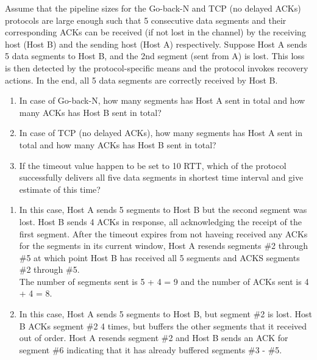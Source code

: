 \documentclass{report}
\begin{document}
\clearpage
\begin{problem}

Assume that the pipeline sizes for the Go-back-N and TCP (no delayed ACKs)
protocols are large enough such that 5 consecutive data segments and their
corresponding ACKs can be received (if not lost in the channel) by the
receiving host (Host B) and the sending host (Host A) respectively.  Suppose
Host A sends 5 data segments to Host B, and the 2nd segment (sent from A) is
lost.  This loss is then detected by the protocol-specific means and the
protocol invokes recovery actions.  In the end, all 5 data segments are
correctly received by Host B.

\begin{enumerate}
\item In case of Go-back-N, how many segments has Host A sent in total and how
      many ACKs has Host B sent in total? 

\item In case of TCP (no delayed ACKs), how many segments has Host A sent in
      total and how many ACKs has Host B sent in total? 

\item If the timeout value happen to be set to 10 RTT, which of the protocol
      successfully delivers all five data segments in shortest time interval
      and give estimate of this time?
\end{enumerate}

\begin{answer}{30em}
  \begin{enumerate}
    \item In this case, Host A sends 5 segments to Host B but the second
          segment was lost. Host B sends 4 ACKs in response, all acknowledging
          the receipt of the first segment. After the timeout expires from not
          haveing received any ACKs for the segments in its current window,
          Host A resends segments \#2 through \#5 at which point Host B has
          received all 5 segments and ACKS segments \#2 through \#5. \\

          The number of segments sent is 5 + 4 = 9 and the number of ACKs sent
          is 4 + 4 = 8.

    \item In this case, Host A sends 5 segments to Host B, but segment \#2 is
          lost. Host B ACKs segment \#2 4 times, but buffers the other segments
          that it received out of order. Host A resends segment \#2 and Host B
          sends an ACK for segment \#6 indicating that it has already buffered
          segments \#3 - \#5.


\end{enumerate}
\end{answer}
\end{problem}
\end{document}
